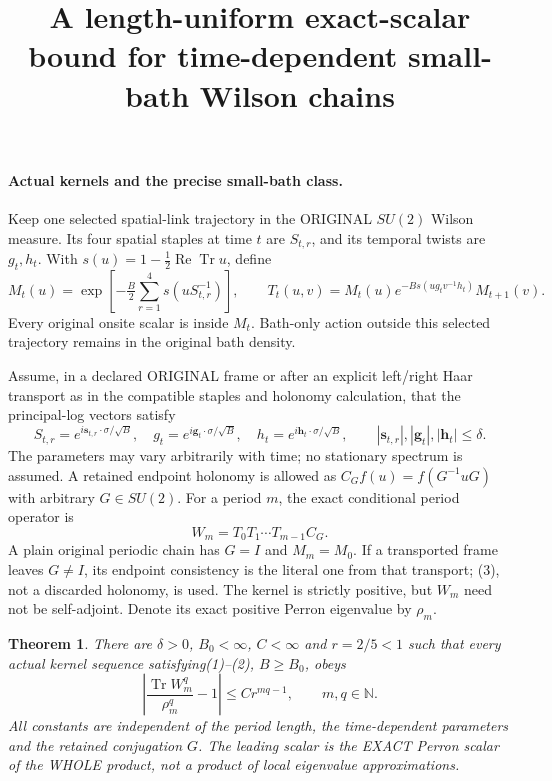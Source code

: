 \documentclass[11pt]{article}
\title{A length-uniform exact-scalar bound for time-dependent small-bath Wilson chains}\author{}\date{}
\newtheorem{theorem}{Theorem}
\newcommand{\Tr}{\operatorname{Tr}}
\begin{document}
\maketitle
\paragraph{Actual kernels and the precise small-bath class.}
Keep one selected spatial-link trajectory in the ORIGINAL $SU(2)$ Wilson measure.
Its four spatial staples at time $t$ are $S_{t,r}$, and its temporal twists are
$g_t,h_t$. With $s(u)=1-\tfrac12\operatorname{Re}\operatorname{Tr}u$, define
\[
 M_t(u)=\exp[-\tfrac B2\sum_{r=1}^4s(uS_{t,r}^{-1})],\qquad
 T_t(u,v)=M_t(u)e^{-Bs(ug_tv^{-1}h_t)}M_{t+1}(v).       \tag{1}
\]
Every original onsite scalar is inside $M_t$. Bath-only action outside this
selected trajectory remains in the original bath density.

Assume, in a declared ORIGINAL frame or after an explicit left/right Haar
transport as in the compatible staples and holonomy calculation, that the principal-log vectors satisfy
\[
 S_{t,r}=e^{i\mathbf s_{t,r}\cdot\sigma/\sqrt B},\quad
 g_t=e^{i\mathbf g_t\cdot\sigma/\sqrt B},\quad
 h_t=e^{i\mathbf h_t\cdot\sigma/\sqrt B},\qquad
 |\mathbf s_{t,r}|,|\mathbf g_t|,|\mathbf h_t|\le\delta.  \tag{2}
\]
The parameters may vary arbitrarily with time; no stationary spectrum is assumed.
A retained endpoint holonomy is allowed as $C_Gf(u)=f(G^{-1}uG)$ with arbitrary
$G\in SU(2)$. For a period $m$, the exact conditional period operator is
\[
 W_m=T_0T_1\cdots T_{m-1}C_G.                         \tag{3}
\]
A plain original periodic chain has $G=I$ and $M_m=M_0$. If a transported frame
leaves $G\ne I$, its endpoint consistency is the literal one from that transport;
(3), not a discarded holonomy, is used. The kernel is strictly positive, but
$W_m$ need not be self-adjoint. Denote its exact positive Perron eigenvalue by
$\rho_m$.

\begin{theorem}
There are $\delta>0$, $B_0<\infty$, $C<\infty$ and $r=2/5<1$ such that every
actual kernel sequence satisfying(1)--(2), $B\ge B_0$, obeys
\[
 \left|\frac{\Tr W_m^q}{\rho_m^q}-1\right|
       \le C r^{mq-1},\qquad m,q\in\mathbb N.          \tag{4}
\]
All constants are independent of the period length, the time-dependent parameters
and the retained conjugation $G$. The leading scalar is the EXACT Perron scalar
of the WHOLE product, not a product of local eigenvalue approximations.
\end{theorem}
\end{document}

